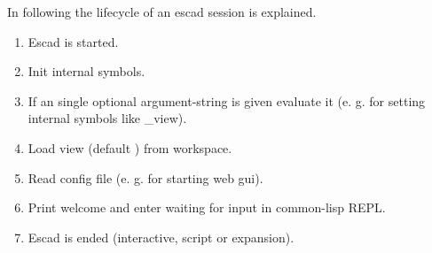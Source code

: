 \documentclass[a4paper, 12pt, openany]{scrbook}
\begin{document}
In following the lifecycle of an escad session is explained.
\begin{enumerate}
\item Escad is started.
\item Init internal symbols.
\item If an single optional argument-string is given evaluate it (e. g. for setting internal symbols like \_view).
\item Load view (default ) from workspace.
\item Read config file  (e. g. for starting web gui).
\item Print welcome and enter waiting for input in common-lisp REPL.
\item Escad is ended (interactive, script or expansion).
\end{enumerate}
\end{document}
